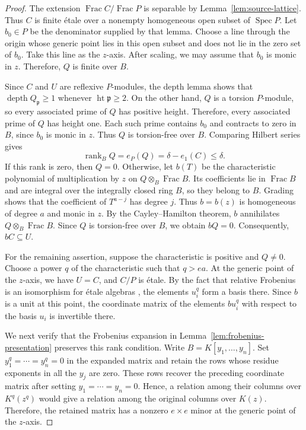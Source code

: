\documentclass[12pt]{amsart}
\numberwithin{equation}{section}
\theoremstyle{definition}
\theoremstyle{remark}
\numberwithin{equation}{section}
\DeclareMathOperator{\Frac}{Frac}
\begin{document}
\begin{proof}
The extension $\Frac C/\Frac P$ is separable by Lemma~\ref{lem:source-lattice}. Thus $C$ is finite \'etale over a nonempty homogeneous open subset of $\operatorname{Spec}P$.
Let $b_0\in P$ be the denominator supplied by that lemma. Choose a line through the origin whose generic point lies in this open subset and does not lie in the zero set of $b_0$. Take this line as the $z$-axis. After scaling, we may assume that $b_0$ is monic in $z$. Therefore, $Q$ is finite over $B$.

Since $C$ and $U$ are reflexive $P$-modules, the depth lemma shows that $\operatorname{depth}Q_{\mathfrak p}\ge1$ whenever $\operatorname{ht}\mathfrak p\ge2$. On the other hand, $Q$ is a torsion $P$-module, so every associated prime of $Q$ has positive height. Therefore, every associated prime of $Q$ has height one. Each such prime contains $b_0$ and contracts to zero in $B$, since $b_0$ is monic in $z$. Thus $Q$ is torsion-free over $B$. Comparing Hilbert series gives
\[
 \operatorname{rank}_B Q=e_P(Q)=\delta-e_1(C)\le \delta.
\]
If this rank is zero, then $Q=0$. Otherwise, let $b(T)$ be the characteristic polynomial of multiplication by $z$ on $Q\otimes_B\Frac B$. Its coefficients lie in $\Frac B$ and are integral over the integrally closed ring $B$, so they belong to $B$. Grading shows that the coefficient of $T^{a-j}$ has degree $j$. Thus $b=b(z)$ is homogeneous of degree $a$ and monic in $z$. By the Cayley--Hamilton theorem, $b$ annihilates $Q\otimes_B\Frac B$. Since $Q$ is torsion-free over $B$, we obtain $bQ=0$. Consequently, $bC\subseteq U$.

 For the remaining assertion, suppose the characteristic is positive and $Q\ne0$. Choose a power $q$ of the characteristic such that $q>ea$.  At the generic point of the $z$-axis, we have $U=C$, and $C/P$ is \'etale. By the fact that relative Frobenius is an isomorphism for \'etale algebras \cite[Tag~0EBS]{Stacks}, the elements $u_i^q$ form a basis there. Since $b$ is a unit at this point, the coordinate matrix of the elements $bu_i^q$ with respect to the basis $u_i$ is invertible there.
 
We next verify that the Frobenius expansion in Lemma~\ref{lem:frobenius-presentation} preserves this rank condition.
Write $B=K[y_1,\ldots,y_n]$. Set $y_1^q=\cdots=y_n^q=0$ in the expanded matrix and retain the rows whose residue exponents in all the $y_j$ are zero. These rows recover the preceding coordinate matrix after setting $y_1=\cdots=y_n=0$. Hence, a relation among their columns over $K^q(z^q)$ would give a relation among the original columns over $K(z)$. Therefore, the retained matrix has a nonzero $e\times e$ minor at the generic point of the $z$-axis.


\end{proof}
\end{document}

